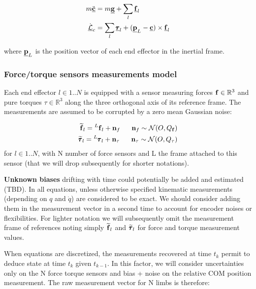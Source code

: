 \documentclass[11pt]{article}
\newcommand{\noise}{\bfn}
\newcommand{\posiv}[1]{\underline{\bfp}_{#1}}
\newcommand{\forcev}[1]{\underline{\bff}_{#1}}
\newcommand{\force}[2]{\prescript{#1}{}{\bff}_{#2}}
\newcommand{\forcem}[2]{\prescript{#1}{}{\widetilde{\bff}}_{#2}}
\newcommand{\torquev}[1]{\underline{\pmb{\tau}}_{#1}}
\newcommand{\torque}[2]{\prescript{#1}{}{\pmb{\tau}}_{#2}}
\newcommand{\torquem}[2]{\prescript{#1}{}{\widetilde{\pmb{\tau}}}_{#2}}
\newcommand{\AMv}{\underline{\mathcal{L}}}
\newcommand{\COMv}{\underline{\bfc}}
\newcommand{\gravv}{\underline{\bfg}}
\newcommand{\Reals}{\mathbb{R}}
\begin{document}
\begin{equation}
\begin{split}
m\ddot{\COMv}&= m\gravv + \sum_l \forcev{l}
\\
\dot{\AMv}_c&= \sum_l \torquev{l} + ( \posiv{L} - \COMv) \times \forcev{l} 
\end{split}
\label{eq:NewtonEuler}
\end{equation}

where \(\posiv{L} \) is the position vector of each end effector in the inertial frame.

\subsubsection{Force/torque sensors measurements model}

Each end effector $l \in 1..N$ is equipped with a sensor measuring forces $\bff \in \Reals^3$ and pure torques $\tau \in \Reals^3$ along the three orthogonal axis of its reference frame. The measurements are assumed to be corrupted by a zero mean Gaussian noise:

\begin{equation}
\begin{split}
    \forcem{}{l} = \force{L}{l} + \noise_f~~~~~\noise_f \sim \mathcal{N}(O,Q_{\bff})
    \\
    \torquem{}{l} = \torque{L}{l} + \noise_{\tau} ~~~~~ \noise_{\tau} \sim \mathcal{N}(O,Q_{\tau})
\end{split}
\end{equation} 
for $l \in 1..N$, with N number of force sensors and L the frame attached to this sensor (that we will drop subsequently for shorter notations).

\textbf{Unknown biases} drifting with time could potentially be added and estimated (TBD). 
In all equations, unless otherwise specified kinematic measurements (depending on $q$ and $\dot{q}$) are considered to be exact. We should consider adding them in the measurement vector in a second time to account for encoder noises or flexibilities.
For lighter notation we will subsequently omit the measurement frame of references noting simply \(\forcem{}{l}\) and \(\torquem{}{l}\) for force and torque measurement values.

When equations are discretized, the measurements recovered at time $t_k$ permit to deduce state at time $t_k$ given $t_{k-1}$. In this factor, we will consider uncertainties only on the N force torque sensors and bias + noise on the relative COM position measurement. The raw measurement vector for N limbs is therefore:
\end{document}
